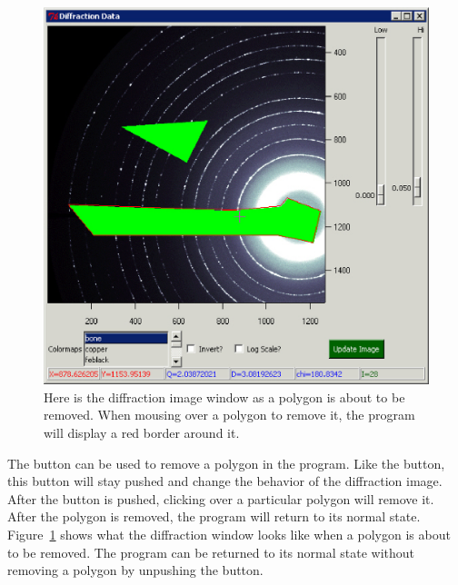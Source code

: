 \begin{figure}
    \centering
    \includegraphics[scale=.75]{figures/Removing_Polygon.eps}
    \caption{Here is the diffraction
    image window as a polygon is about to be removed.
    When mousing over a polygon to remove it,
    the program will display a red border around it.}
    \label{Removing_Polygon}
\end{figure}

The  button can be used to remove
a polygon in the program. Like the  
button, this button will stay pushed and change the
behavior of the diffraction image. After the 
 button is pushed, clicking over
a particular polygon will remove it.
After the polygon is removed, the program will 
return to its normal state.
Figure~\ref{Removing_Polygon} shows what the diffraction
window looks like when a polygon is about to be removed.
The program can be returned to its normal state without
removing a polygon by unpushing the 
button.

